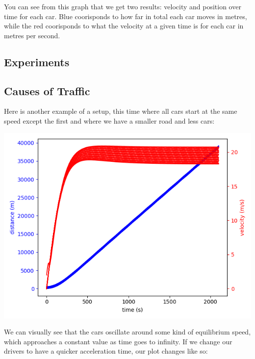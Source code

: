 \documentclass[11pt]{article}
\begin{document}
\begin{multicols}{2}
		\indent You can see from this graph that we get two results: velocity and position over time for each car. Blue coorisponds to how far in total each car moves in metres, while the red coorisponds
		to what the velocity at a given time is for each car in metres per second.

	\begin{center}

	\section*{Experiments}

		\subsection*{Causes of Traffic}

	\end{center}

		\indent Here is another example of a setup, this time where all cars start at the same speed except the first and where we have a smaller road and less cars:


		\includegraphics[scale = 0.5]{Figure_2.png}

		\indent We can visually see that the cars oscillate around some kind of equilibrium speed, which approaches a constant value as time goes to infinity. If we change our drivers to have a quicker acceleration time,
		our plot changes like so:


\end{multicols}
\end{document}
